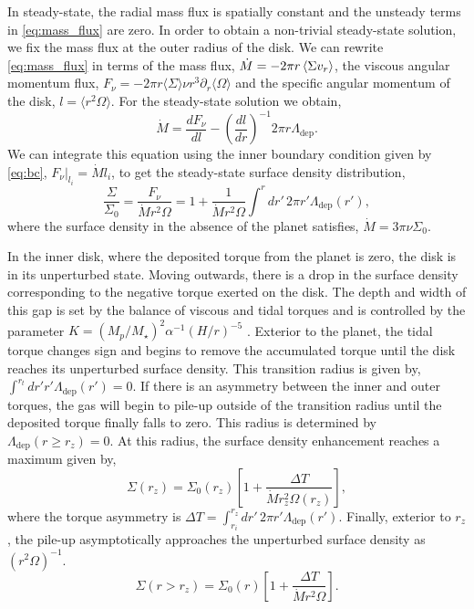 In steady-state, the radial mass flux is spatially constant and the unsteady terms in \eqref{eq:mass_flux} are zero. In order to obtain a non-trivial steady-state solution, we fix the mass flux at the outer radius of the disk. We can rewrite \eqref{eq:mass_flux} in terms of the mass flux, $\dot{M} = -2 \pi r \left\langle \Sigma v_r \right\rangle$, the viscous angular momentum flux, $F_\nu = - 2 \pi r \langle \Sigma \rangle \nu r^3 \partial_r \langle \Omega \rangle$ and the specific angular momentum of the disk, $l = \langle r^2 \Omega \rangle$. For the steady-state solution we obtain,
\begin{equation}
\dot{M} = \frac{d F_\nu}{d l} - \left( \frac{d l}{d r} \right)^{-1} 2 \pi  r \Lambda_\text{dep} .
\end{equation}
We can integrate this equation using the inner boundary condition given by \eqref{eq:bc}, $F_\nu |_{l_i} = \dot{M} l_i$, to get the steady-state surface density distribution,
\begin{equation} \label{eq:ss_eqn}
\frac{\Sigma}{\Sigma_0} = \frac{F_\nu}{\dot{M} r^2 \Omega } = 1 + \frac{1}{\dot{M} r^2 \Omega } \int^r dr' \, 2 \pi r' \Lambda_\text{dep}(r'), 
\end{equation}
where the surface density in the absence of the planet satisfies, $\dot{M} = 3 \pi \nu \Sigma_0$. 

In the inner disk, where the deposited torque from the planet is zero, the disk is in its unperturbed state. Moving outwards, there is a drop in the surface density corresponding to the negative torque exerted on the disk. The depth and width of this gap is set by the balance of viscous and tidal torques and is controlled by the parameter $K = \left( M_p / M_\star \right)^2 \alpha^{-1} \left( H / r \right)^{-5}$ \citep{1986ApJ...309..846L, 2015ApJ...807L..11D,2015MNRAS.448..994K,2016PASJ...68...43K}. Exterior to the planet, the tidal torque changes sign and begins to remove the accumulated torque until the disk reaches its unperturbed surface density. This transition radius is given by, $ \int^{r_t} dr ' r' \Lambda_\text{dep}(r') = 0$. If there is an asymmetry between the inner and outer torques, the gas will begin to pile-up outside of the transition radius until the deposited torque finally falls to zero. This radius is determined by $\Lambda_\text{dep}(r \ge r_z) = 0$. At this radius, the surface density enhancement reaches a maximum given by,
\begin{equation}
\Sigma(r_z) = \Sigma_0(r_z) \left[ 1 + \frac{\Delta T}{\dot{M} r_z^2 \Omega(r_z)} \right],
\end{equation}
where the torque asymmetry is $ \Delta T = \int_{r_i}^{r_z} dr' \, 2 \pi r' \Lambda_\text{dep}(r')$.  Finally, exterior to $r_z$, the pile-up asymptotically approaches the unperturbed surface density as $(r^2 \Omega)^{-1}$. 
\begin{equation}
\Sigma(r > r_z) = \Sigma_0(r) \left[ 1 + \frac{\Delta T}{\dot{M} r^2 \Omega} \right] .
\end{equation}


